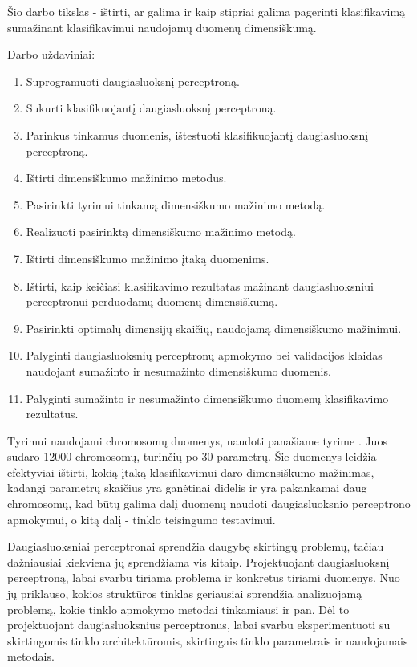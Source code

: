 \documentclass{VUMIFPSbakalaurinis}
\begin{document}
Šio darbo tikslas - ištirti, ar galima ir kaip stipriai galima pagerinti klasifikavimą sumažinant klasifikavimui naudojamų duomenų dimensiškumą.

Darbo uždaviniai:
\begin{enumerate}
	\item Suprogramuoti daugiasluoksnį perceptroną.
	\item Sukurti klasifikuojantį daugiasluoksnį perceptroną.
	\item Parinkus tinkamus duomenis, ištestuoti klasifikuojantį daugiasluoksnį perceptroną.

	\item Ištirti dimensiškumo mažinimo metodus.
	\item Pasirinkti tyrimui tinkamą dimensiškumo mažinimo metodą.
	\item Realizuoti pasirinktą dimensiškumo mažinimo metodą.
	\item Ištirti dimensiškumo mažinimo įtaką duomenims.
	
	\item Ištirti, kaip keičiasi klasifikavimo rezultatas mažinant daugiasluoksniui perceptronui perduodamų duomenų dimensiškumą.
	\item Pasirinkti optimalų dimensijų skaičių, naudojamą dimensiškumo mažinimui.
	\item Palyginti daugiasluoksnių perceptronų apmokymo bei validacijos klaidas naudojant sumažinto ir nesumažinto dimensiškumo duomenis.
	\item Palyginti sumažinto ir nesumažinto dimensiškumo duomenų klasifikavimo rezultatus.
\end{enumerate}

Tyrimui naudojami chromosomų duomenys, naudoti panašiame tyrime \cite[289~psl.]{price-dimensionality-reduction}.
Juos sudaro 12000 chromosomų, turinčių po 30 parametrų.
Šie duomenys leidžia efektyviai ištirti, kokią įtaką klasifikavimui daro dimensiškumo mažinimas, kadangi parametrų skaičius yra ganėtinai didelis ir yra pakankamai daug chromosomų, kad būtų galima dalį duomenų naudoti daugiasluoksnio perceptrono apmokymui, o kitą dalį - tinklo teisingumo testavimui.

Daugiasluoksniai perceptronai sprendžia daugybę skirtingų problemų, tačiau dažniausiai kiekviena jų sprendžiama vis kitaip.
Projektuojant daugiasluoksnį perceptroną, labai svarbu tiriama problema ir konkretūs tiriami duomenys.
Nuo jų priklauso, kokios struktūros tinklas geriausiai sprendžia analizuojamą problemą, kokie tinklo apmokymo metodai tinkamiausi ir pan.
Dėl to projektuojant daugiasluoksnius perceptronus, labai svarbu eksperimentuoti su skirtingomis tinklo architektūromis, skirtingais tinklo parametrais ir naudojamais metodais.
\end{document}
